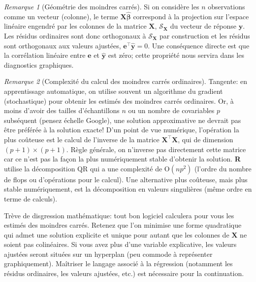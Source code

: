 \documentclass[
  11pt,
  letterpaper,
]{article}
\theoremstyle{definition}
\theoremstyle{definition}
\theoremstyle{definition}
\theoremstyle{definition}
\theoremstyle{remark}
\newtheorem*{remark}{Remarque}
\begin{document}
\begin{remark}[Géométrie des moindres carrés]
Si on considère les \(n\) observations comme un vecteur (colonne), le terme \(\mathbf{X} \widehat{\boldsymbol{\beta}}\) correspond à la projection sur l'espace linéaire engendré par les colonnes de la matrice \(\mathbf{X}\), \(\mathscr{S}_{\mathbf{X}}\) du vecteur de réponse \(\boldsymbol{y}\). Les résidus ordinaires sont donc orthogonaux à \(\mathscr{S}_{\mathbf{X}}\) par construction et les résidus sont orthogonaux aux valeurs ajustées, \(\boldsymbol{e}^\top\widehat{\boldsymbol{y}}=0\).
Une conséquence directe est que la corrélation linéaire entre \(\boldsymbol{e}\) et \(\widehat{\boldsymbol{y}}\) est zéro; cette propriété nous servira dans les diagnostics graphiques.
\end{remark}

\begin{remark}[Complexité du calcul des moindres carrés ordinaires]
Tangente: en apprentissage automatique, on utilise souvent un algorithme du gradient (stochastique) pour obtenir les estimés des moindres carrés ordinaires. Or, à moins d'avoir des tailles d'échantillons \(n\) ou un nombre de covariables \(p\) subséquent (pensez échelle Google), une solution approximative ne devrait pas être préférée à la solution exacte! D'un point de vue numérique, l'opération la plus coûteuse est le calcul de l'inverse de la matrice \(\mathbf{X}^\top\mathbf{X}\), qui de dimension \((p+1) \times (p+1)\). Règle générale, on n'inverse pas directement cette matrice car ce n'est pas la façon la plus numériquement stable d'obtenir la solution. \textbf{R} utilise la décomposition QR qui a une complexité de \(\mathrm{O}(np^2)\) (l'ordre du nombre de flops ou d'opérations pour le calcul). Une alternative plus coûteuse, mais plus stable numériquement, est la décomposition en valeurs singulières (même ordre en terme de calculs).
\end{remark}

Trève de disgression mathématique: tout bon logiciel calculera pour vous les estimés des moindres carrés. Retenez que l'on minimise une forme quadratique qui admet une solution explicite et unique pour autant que les colonnes de \(\mathbf{X}\) ne soient pas colinéaires. Si vous avez plus d'une variable explicative, les valeurs ajustées seront situées sur un hyperplan (peu commode à représenter graphiquement). Maîtriser le langage associé à la régression (notamment les résidus ordinaires, les valeurs ajustées, etc.) est nécessaire pour la continuation.
\end{document}
